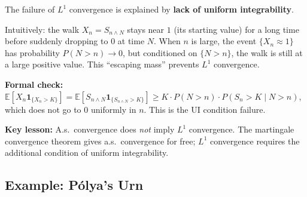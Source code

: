 \documentclass[12pt]{article}
\newcommand{\E}{\mathbb{E}}
\newcommand{\1}{\mathbf{1}}
\begin{document}
\begin{tcolorbox}[bluebox={Discussion: Why $L^1$ Convergence Fails}]
The failure of $L^1$ convergence is explained by \textbf{lack of uniform integrability}.

\medskip
Intuitively: the walk $X_n = S_{n\wedge N}$ stays near $1$ (its starting value) for a
long time before suddenly dropping to $0$ at time $N$.  When $n$ is large, the event
$\{X_n \approx 1\}$ has probability $P(N > n) \to 0$, but conditioned on $\{N > n\}$,
the walk is still at a large positive value.  This ``escaping mass'' prevents $L^1$
convergence.

\medskip
\textbf{Formal check:}
$\E[X_n \1_{\{X_n > K\}}] = \E[S_{n \wedge N} \1_{\{S_{n\wedge N} > K\}}]
\ge K \cdot P(N > n) \cdot P(S_n > K \mid N > n)$,
which does not go to $0$ uniformly in $n$.  This is the UI condition failure.

\medskip
\textbf{Key lesson:} A.s.\ convergence does \emph{not} imply $L^1$ convergence.
The martingale convergence theorem gives a.s.\ convergence for free; $L^1$ convergence
requires the additional condition of uniform integrability.
\end{tcolorbox}

\subsection{Example: Pólya's Urn}
\end{document}
